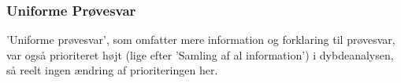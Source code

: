 \subsubsection{Uniforme Prøvesvar}
’Uniforme prøvesvar’, som omfatter mere information og forklaring til prøvesvar, var også prioriteret højt (lige efter ’Samling af al information’) i dybdeanalysen, så reelt ingen ændring af prioriteringen her.   
